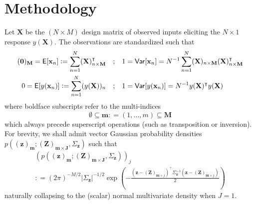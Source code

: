\documentclass[preprint,12pt]{elsarticle}
\newcommand*{\M}[1]{\ensuremath{#1}\xspace}
\newcommand*{\vr}[1]{\M{\mathbf{#1}}}
\newcommand*{\deq}{\M{\mathrel{\mathop:}=}}
\newcommand{\T}[1]{\text{#1}}
\newcommand*{\QT}[2][]{\M{\quad\T{#2}\ifthenelse{\equal{#1}{}}{\quad}{#1}}}
\newcommand*{\ev}[1]{\mathsf{E}\!\left\lbrack{} #1 \right\rbrack}
\newcommand*{\var}[1]{\mathsf{Var}\!\left\lbrack{} #1 \right\rbrack}
\newcommand*{\modulus}[1]{\M{\left\lvert#1\right\rvert}}
\begin{document}
    \section{Methodology} \label{sec:Method}
        Let $\vr{X}$ be the $(N \times M)$ design matrix of observed inputs eliciting the $N \times 1$ response $y(\vr{X})$. The observations are standardized such that
        \begin{align*}
            (\vr{0})_\vr{M} = \ev{\vr{x}_{n}} \deq \sum_{n=1}^{N} (\vr{X})_{n \times \vr{M}}^{\intercal} 
            &\QT{;} 1 = \var{\vr{x}_{n}} = N^{-1}\sum_{n=1}^{N} (\vr{X})_{n \times \vr{M}} (\vr{X})_{n \times \vr{M}}^{\intercal}
            \\
            0 = \ev{y(\vr{x}_{n})} \deq \sum_{n=1}^{N} (y(\vr{X}))_{n} 
            &\QT{;} 1 = \var{y(\vr{x}_{n})} = N^{-1} y(\vr{X})^{\intercal}y(\vr{X})
        \end{align*}
        where boldface subscripts refer to the multi-indices
        \begin{equation} \label{eq:Method:MultiIndexDef}
            \emptyset\subseteq\vr{m}\deq(1,\ldots,m) \subseteq \vr{M}
        \end{equation}
        which always precede superscript operations (such as transposition or inversion). For brevity, we shall admit vector Gaussian probability densities $p\!\left((\vr{z})_{\vr{m}} ; (\vr{Z})_{\vr{m}\times\vr{J}}, \Sigma_{\vr{z}}\right)$ such that
        \begin{multline} \label{eq:Method:pDef}
            \left(p\!\left((\vr{z})_{\vr{m}} ; (\vr{Z})_{\vr{m}\times\vr{J}}, \Sigma_{\vr{z}}\right)\right)_{j} \\
            \deq (2 \pi)^{-M/2} \modulus{\Sigma_{\vr{z}}}^{-1/2} \exp\left(-\frac
            {(\vr{z}-(\vr{Z})_{\vr{m}\times j})^{\intercal} \Sigma_{\vr{z}}^{-1} (\vr{z}-(\vr{Z})_{\vr{m}\times j})}{2}
            \right)             
        \end{multline}
        naturally collapsing to the (scalar) normal multivariate density when $J=1$.
\end{document}
